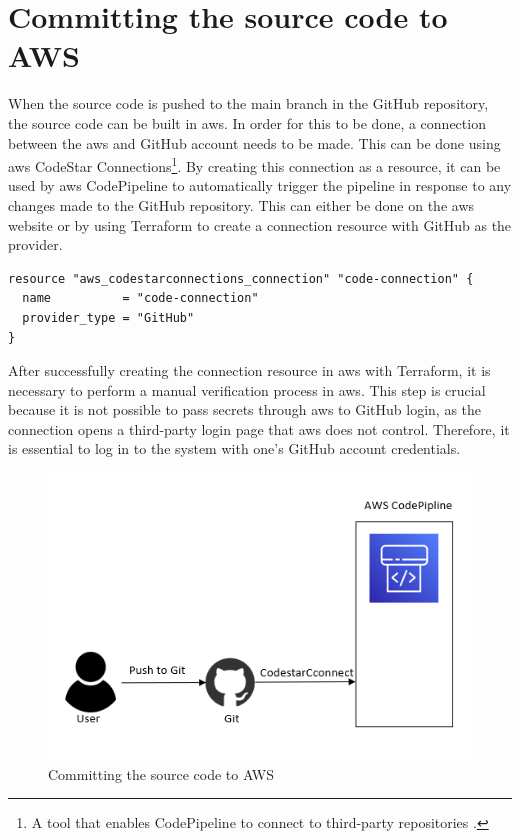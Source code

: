 \section{Committing the source code to AWS}
When the source code is pushed to the main branch in the GitHub repository, the source code can be built in \acrshort{aws}. In order for this to be done, a connection between the \acrshort{aws} and GitHub account needs to be made. This can be done using \acrshort{aws} CodeStar Connections\footnote{A tool that enables CodePipeline to connect to third-party repositories \cite{CodeStarConnections}.}. By creating this connection as a resource, it can be used by \acrshort{aws} CodePipeline to automatically trigger the pipeline in response to any changes made to the GitHub repository.
This can either be done on the \acrshort{aws} website or by using Terraform to create a connection resource with GitHub as the provider.

\begin{tcolorbox}
\begin{verbatim}
resource "aws_codestarconnections_connection" "code-connection" {
  name          = "code-connection"
  provider_type = "GitHub"
}    
\end{verbatim}
\end{tcolorbox}

After successfully creating the connection resource in \acrshort{aws} with Terraform, it is necessary to perform a manual verification process in \acrshort{aws}. This step is crucial because it is not possible to pass secrets through \acrshort{aws} to GitHub login, as the connection opens a third-party login page that \acrshort{aws} does not control. Therefore, it is essential to log in to the system with one's GitHub account credentials.

\vspace{2mm}
\begin{figure}[H]
    \centering
    \includegraphics[width=0.6\columnwidth]{Images/aws-piplin-2-1.png}
    \caption{Committing the source code to AWS}
    \label{fig: Committing the source code to AWS}
\end{figure}

